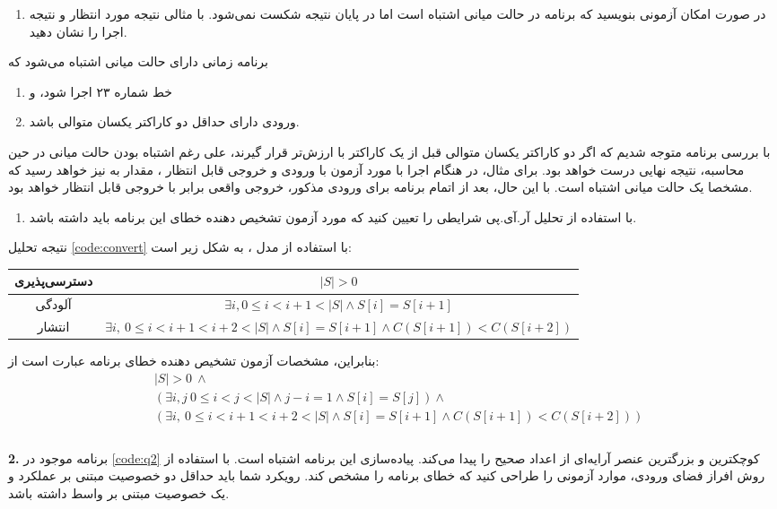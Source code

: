 \documentclass{article}
\newenvironment{answer}{}{\\[.3ex]}
\newenvironment{question}[1]{\textbf{#1.} }{}
\newenvironment{qitem}[1]{%
	\begin{enumerate}\item[(#1)]}{\end{enumerate}}
\begin{document}
\begin{qitem}{d}
در صورت امکان آزمونی بنویسید که برنامه در حالت میانی اشتباه است اما در پایان نتیجه شکست نمی‌شود. با مثالی نتیجه مورد انتظار و نتیجه اجرا را نشان دهید.
\end{qitem}
\begin{answer}
برنامه زمانی دارای حالت میانی اشتباه می‌شود که
\begin{enumerate}
	\item خط شماره ۲۳ اجرا شود، و
	\item ورودی دارای حداقل دو کاراکتر یکسان متوالی باشد.
\end{enumerate}
با بررسی برنامه متوجه شدیم که اگر دو کاراکتر یکسان متوالی قبل از یک کاراکتر با ارزش‌تر قرار گیرند، علی رغم اشتباه بودن حالت میانی در حین محاسبه، نتیجه نهایی درست خواهد بود. برای مثال، در هنگام اجرا با مورد آزمون با ورودی  و خروجی قابل انتظار ، مقدار  به  نیز خواهد رسید که مشخصا یک حالت میانی اشتباه است. با این حال، بعد از اتمام برنامه برای ورودی مذکور، خروجی واقعی برابر با خروجی قابل انتظار خواهد بود.
\end{answer}
\begin{qitem}{e}
با استفاده از تحلیل آر.آی.پی شرایطی را تعیین کنید که مورد آزمون تشخیص دهنده خطای این برنامه باید داشته باشد.
\end{qitem}
\begin{answer}
نتیجه تحلیل \autoref{code:convert} با استفاده از مدل ، به شکل زیر است:

\begin{table}[h]
	\centering
\begin{tabular}{c|c}
	دسترسی‌پذیری & $|S| > 0$\\\hline
	آلودگی & $\exists i, 0 \leq i < i + 1 < |S| \wedge S[i]=S[i+1]$\\\hline
	انتشار &
	$\exists i,\ 0 \leq i < i + 1 < i + 2 < |S| \wedge S[i]=S[i+1] \wedge C(S[i+1]) < C(S[i+2])$
\end{tabular}
\end{table}
بنابراین، مشخصات آزمون تشخیص دهنده خطای برنامه عبارت است از:
\begin{align*}
	&|S| > 0\ \wedge\\
	&\left(\exists i, j\ 0 \leq i < j < |S| \wedge j - i = 1 \wedge S[i]=S[j]\right) \wedge\\
	& \left(\exists i,\ 0 \leq i < i + 1 < i + 2 < |S| \wedge S[i]=S[i+1] \wedge C(S[i+1]) < C(S[i+2])\right)\\
\end{align*}
\end{answer}
\begin{question}{2}
برنامه موجود در \autoref{code:q2} کوچکترین و بزرگترین عنصر آرایه‌ای از اعداد صحیح را پیدا می‌کند. پیاده‌سازی این برنامه اشتباه است. با استفاده از روش افراز فضای ورودی، موارد آزمونی را طراحی کنید که خطای برنامه را مشخص کند. رویکرد شما باید حداقل دو خصوصیت مبتنی بر عملکرد و یک خصوصیت مبتنی بر واسط داشته باشد.
\end{question}
\end{document}
